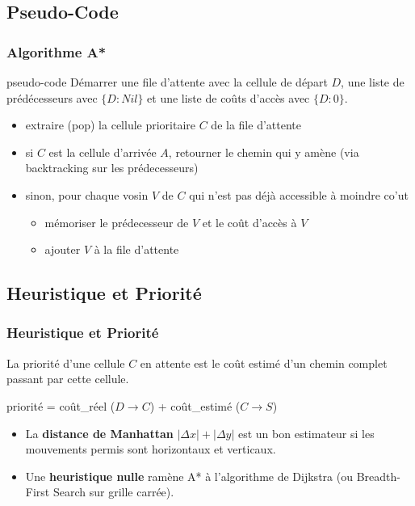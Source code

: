\documentclass{beamer}
\begin{document}
\subsection{Pseudo-Code}
\begin{frame}
  \frametitle{Algorithme A*}
  \begin{block}{pseudo-code}
    Démarrer une file d'attente avec la cellule de départ $D$, une liste de
    prédécesseurs avec $\{D:Nil\}$ et une liste de coûts d'accès avec
    $\{D:0\}$.
    \medskip
    
    \begin{itemize}
    \item<3-> extraire (pop) la cellule prioritaire $C$ de la file d'attente
    \item<4-> si $C$ est la cellule d'arrivée $A$, retourner le chemin qui y amène
          (via backtracking sur les prédecesseurs)
    \item<5-> sinon, pour chaque vosin $V$ de $C$ qui n'est pas déjà accessible
      à moindre co'ut
      \begin{itemize}
      \item<6-> mémoriser le prédecesseur de $V$ et le coût d'accès à $V$
      \item<7-> ajouter $V$ à la file d'attente
      \end{itemize}
    \end{itemize}    
  \end{block}
\end{frame}

\subsection{Heuristique et Priorité}
\begin{frame}
  \frametitle{Heuristique et Priorité}
  La priorité d'une cellule $C$ en attente est le coût estimé d'un chemin
  complet passant par cette cellule.
  \smallskip

  priorité = coût\_réel ($D \rightarrow C$) + coût\_estimé ($C\rightarrow S$)

  \medskip
  \begin{itemize}
  \item<3->{La \textbf{distance de Manhattan} $|\Delta x| + |\Delta y|$
    est un bon estimateur si les mouvements permis sont horizontaux et verticaux.}
  \par
  \item<4>{Une \textbf{heuristique nulle} ramène A* à l'algorithme de Dijkstra
      (ou Breadth-First Search sur grille carrée).}
  \end{itemize}
\end{frame}
\end{document}
